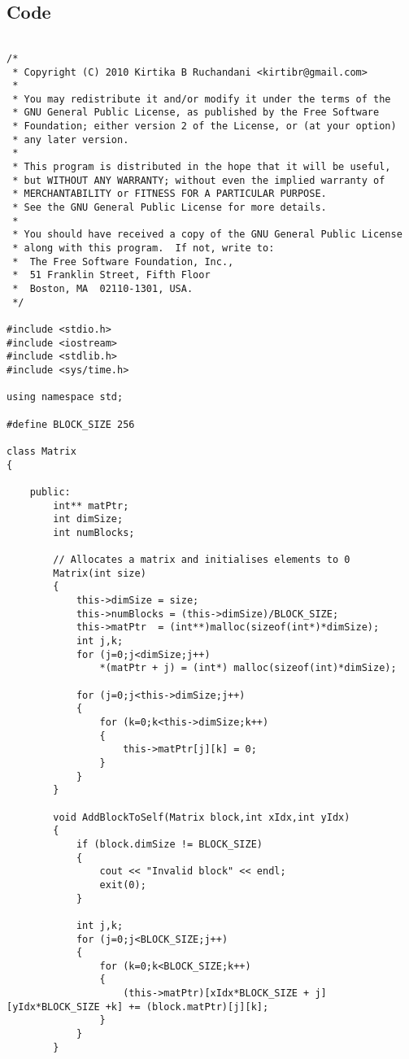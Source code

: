 \documentclass[a4paper]{article}
\begin{document}
\subsection{\color{db}Code}
\begin{lstlisting}

/*
 * Copyright (C) 2010 Kirtika B Ruchandani <kirtibr@gmail.com> 
 * 
 * You may redistribute it and/or modify it under the terms of the
 * GNU General Public License, as published by the Free Software
 * Foundation; either version 2 of the License, or (at your option)
 * any later version.
 * 
 * This program is distributed in the hope that it will be useful,
 * but WITHOUT ANY WARRANTY; without even the implied warranty of
 * MERCHANTABILITY or FITNESS FOR A PARTICULAR PURPOSE.
 * See the GNU General Public License for more details.
 * 
 * You should have received a copy of the GNU General Public License
 * along with this program.  If not, write to:
 * 	The Free Software Foundation, Inc.,
 * 	51 Franklin Street, Fifth Floor
 * 	Boston, MA  02110-1301, USA.
 */

#include <stdio.h>
#include <iostream>
#include <stdlib.h>
#include <sys/time.h>

using namespace std;

#define BLOCK_SIZE 256

class Matrix
{

    public:
        int** matPtr;
        int dimSize;
        int numBlocks;

        // Allocates a matrix and initialises elements to 0
        Matrix(int size)
        { 
            this->dimSize = size;
            this->numBlocks = (this->dimSize)/BLOCK_SIZE;
            this->matPtr  = (int**)malloc(sizeof(int*)*dimSize);
            int j,k;
            for (j=0;j<dimSize;j++)
                *(matPtr + j) = (int*) malloc(sizeof(int)*dimSize);

            for (j=0;j<this->dimSize;j++)
            {
                for (k=0;k<this->dimSize;k++)
                {
                    this->matPtr[j][k] = 0;
                }
            }
        }

        void AddBlockToSelf(Matrix block,int xIdx,int yIdx)
        {
            if (block.dimSize != BLOCK_SIZE)
            {
                cout << "Invalid block" << endl;
                exit(0);
            }

            int j,k;
            for (j=0;j<BLOCK_SIZE;j++)
            {
                for (k=0;k<BLOCK_SIZE;k++)
                {
                    (this->matPtr)[xIdx*BLOCK_SIZE + j][yIdx*BLOCK_SIZE +k] += (block.matPtr)[j][k];
                }
            }
        }




\end{lstlisting}
\end{document}
